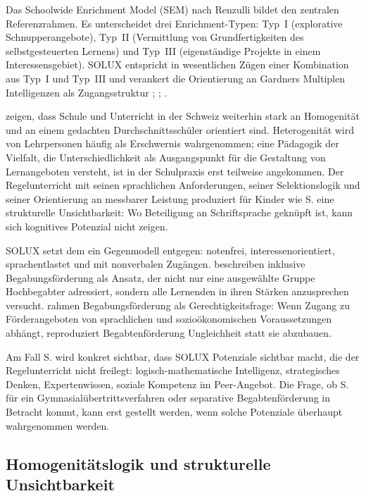 \documentclass[ngerman, a4paper]{article}
\begin{document}
Das Schoolwide Enrichment Model (SEM) nach Renzulli bildet den zentralen
Referenzrahmen. Es unterscheidet drei Enrichment-Typen: Typ~I (explorative
Schnupperangebote), Typ~II (Vermittlung von Grundfertigkeiten des selbstgesteuerten
Lernens) und Typ~III (eigenständige Projekte in einem Interessensgebiet). SOLUX
entspricht in wesentlichen Zügen einer Kombination aus Typ~I und Typ~III und verankert
die Orientierung an Gardners Multiplen Intelligenzen als Zugangsstruktur
\parencite{muelleroppliger2021handbuch};
\parencite[S.\,95--103]{hoyer2013begabung};
\parencite[S.\,34--41]{trautmann2016einfuehrung}.
 
\textcite{buholzer2010allegleich} zeigen, dass Schule und Unterricht in der Schweiz weiterhin
stark an Homogenität und an einem gedachten Durchschnittsschüler orientiert sind.
Heterogenität wird von Lehrpersonen häufig als Erschwernis wahrgenommen; eine
Pädagogik der Vielfalt, die Unterschiedlichkeit als Ausgangspunkt für die Gestaltung
von Lernangeboten versteht, ist in der Schulpraxis erst teilweise angekommen.
Der Regelunterricht mit seinen sprachlichen
Anforderungen, seiner Selektionslogik und seiner Orientierung an messbarer Leistung
produziert für Kinder wie S. eine strukturelle Unsichtbarkeit: Wo Beteiligung an Schriftsprache
geknüpft ist, kann sich kognitives Potenzial nicht zeigen.
 
SOLUX setzt dem ein Gegenmodell entgegen: notenfrei, interessenorientiert,
sprachentlastet und mit nonverbalen Zugängen. \textcite{weigand2021separativ} beschreiben inklusive
Begabungsförderung als Ansatz, der nicht nur eine ausgewählte Gruppe Hochbegabter
adressiert, sondern alle Lernenden in ihren Stärken anzusprechen versucht.
\textcite{sedmak2021bildungsgerechtigkeit} rahmen Begabungsförderung als
Gerechtigkeitsfrage: Wenn Zugang zu Förderangeboten von sprachlichen und
sozioökonomischen Voraussetzungen abhängt, reproduziert Begabtenförderung
Ungleichheit statt sie abzubauen.
 
Am Fall S. wird konkret sichtbar, dass SOLUX Potenziale sichtbar macht, die der
Regelunterricht nicht freilegt: logisch-mathematische Intelligenz, strategisches Denken,
Expertenwissen, soziale Kompetenz im Peer-Angebot. Die Frage, ob S. für ein
Gymnasialübertrittsverfahren oder separative Begabtenförderung in Betracht kommt,
kann erst gestellt werden, wenn solche Potenziale überhaupt wahrgenommen werden.


\subsection{Homogenitätslogik und strukturelle Unsichtbarkeit}
\end{document}
